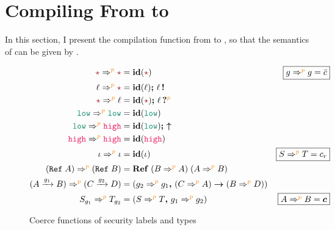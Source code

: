 \chapter{Compiling From \Surface to \CC}
\label{ch:compile}

In this section, I present the compilation function from \Surface to \CC, so
that the semantics of \Surface can be given by \CC.

\begin{figure}[tbp]
  \raggedright
  \begin{align*}
    \unk \Rightarrow^{\bl{p}} \unk &= \id{\unk} & \fbox{$g\Rightarrow^{\bl{p}}g=\bar{c}$} \\
    \ell \Rightarrow^{\bl{p}} \unk &= \id{\ell} \seq \inj{\ell} \\
    \unk \Rightarrow^{\bl{p}} \ell &= \id{\unk} \seq \proj{\ell}{\bl{p}} \\
    \low \Rightarrow^{\bl{p}} \low &= \id{\low} \\
    \low \Rightarrow^{\bl{p}} \high &= \id{\low} \seq \up \\
    \high \Rightarrow^{\bl{p}} \high &= \id{\high} \\
    \iota \Rightarrow^{\bl{p}} \iota &= \id{\iota} & \fbox{$S \Rightarrow^{\bl{p}} T = c_r$} \\
    (\Refer{A}) \Rightarrow^{\bl{p}} (\Refer{B}) &= \refco{(B \Rightarrow^{\bl{p}} A)}{(A \Rightarrow^{\bl{p}} B)} \\
    (\Fun{A}{g_1}{B}) \Rightarrow^{\bl{p}} (\Fun{C}{g_2}{D}) &= (\funco{g_2 \Rightarrow^{\bl{p}} g_1}{(C \Rightarrow^{\bl{p}} A)}{(B \Rightarrow^{\bl{p}} D)}) \\
    S_{g_1} \Rightarrow^{\bl{p}} T_{g_2} &= (\coerc{S \Rightarrow^{\bl{p}} T}{g_1 \Rightarrow^{\bl{p}} g_2}) & \fbox{$A \Rightarrow^{\bl{p}} B = \bm{c}$}
  \end{align*}
  \caption{Coerce functions of security labels and types}
  \label{fig:coerce}
\end{figure}

